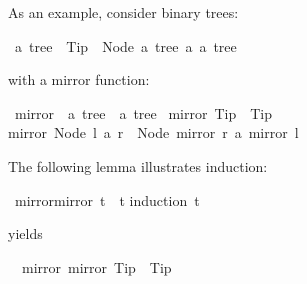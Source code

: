 \begin{isabellebody}
\begin{isamarkuptext}
As an example, consider binary trees:%
\end{isamarkuptext}%
\isamarkuptrue%
\isamarkupfalse%
\ {}a\ tree\ {}\ Tip\ {}\ Node\ {}{}{}a\ tree{}{}\ {}a\ {}{}{}a\ tree{}{}%
\begin{isamarkuptext}%
with a mirror function:%
\end{isamarkuptext}%
\isamarkuptrue%
\isamarkupfalse%
\ mirror\ {}{}\ {}{}a\ tree\ {}\ {}a\ tree{}\ \isanewline
{}mirror\ Tip\ {}\ Tip{}\ {}\isanewline
{}mirror\ {}Node\ l\ a\ r{}\ {}\ Node\ {}mirror\ r{}\ a\ {}mirror\ l{}{}%
\begin{isamarkuptext}%
The following lemma illustrates induction:%
\end{isamarkuptext}%
\isamarkuptrue%
\isamarkupfalse%
\ {}mirror{}mirror\ t{}\ {}\ t{}\isanewline
%
\isadelimproof
%
\endisadelimproof
%
\isatagproof
{}\isamarkupfalse%
{}induction\ t{}%
\begin{isamarkuptxt}%
yields
\begin{isabelle}%
\ {}{}\ mirror\ {}mirror\ Tip{}\ {}\ Tip\isanewline

\end{isabelle}
\end{isamarkuptxt}
\end{isabellebody}
